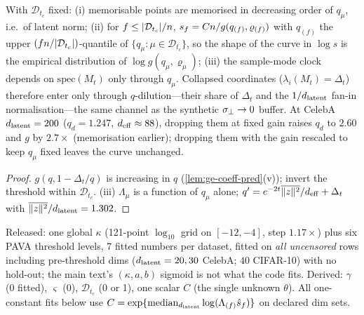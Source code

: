 \begin{corollary}[sketched]\label{cor:shape-from-qmu-pred}
With $\mathcal D_{t_c}$ fixed: (i) memorisable points are memorised in decreasing order of $q_\mu$, i.e.\ of latent norm; (ii) for $f\le|\mathcal D_{t_c}|/n$, $s_f=Cn/g(q_{(f)},\varrho_{(f)})$ with $q_{(f)}$ the upper $(fn/|\mathcal D_{t_c}|)$-quantile of $\{q_\mu:\mu\in\mathcal D_{t_c}\}$, so the shape of the curve in $\log s$ is the empirical distribution of $\log g(q_\mu,\varrho_\mu)$; (iii) the sample-mode clock depends on $\mathrm{spec}(M_t)$ only through $q_\mu$. Collapsed coordinates ($\lambda_i(M_t)=\Delta_t$) therefore enter only through $q$-dilution---their share of $\Delta_t$ and the $1/d_{\mathrm{latent}}$ fan-in normalisation---the same channel as the synthetic $\sigma_{\perp}\to0$ buffer. At CelebA $d_{\mathrm{latent}}=200$ ($q_d=1.247$, $d_{\rm eff}\approx88$), dropping them at fixed gain raises $q_d$ to $2.60$ and $g$ by $2.7\times$ (memorisation earlier); dropping them with the gain rescaled to keep $q_\mu$ fixed leaves the curve unchanged.
\end{corollary}
\begin{proof}
$g(q,1-\Delta_t/q)$ is increasing in $q$ (\cref{lem:ge-coeff-pred}(v)); invert the threshold within $\mathcal D_{t_c}$. (iii) $\Lambda_\mu$ is a function of $q_\mu$ alone; $q'=e^{-2t}\overline{\|z\|^2}/d_{\rm eff}+\Delta_t$ with $\overline{\|z\|^2}/d_{\mathrm{latent}}=1.302$.
\end{proof}

\begin{remark}\label{rem:param-count-pred}
Released: one global $\kappa$ (121-point $\log_{10}$ grid on $[-12,-4]$, step $1.17\times$) plus six PAVA threshold levels, 7 fitted numbers per dataset, fitted on \emph{all uncensored} rows including pre-threshold dims ($d_{\mathrm{latent}}=20,30$ CelebA; $40$ CIFAR-10) with no hold-out; the main text's $(\kappa,a,b)$ sigmoid is not what the code fits. Derived: $\gamma$ (0 fitted), $\varsigma$ (0), $\mathcal D_{t_c}$ (0 or 1), one scalar $C$ (the single unknown $\theta$). All one-constant fits below use $C=\exp\{\mathrm{median}_{d_{\mathrm{latent}}}\log(\Lambda_{(f)}\hat s_f)\}$ on declared dim sets.
\end{remark}

